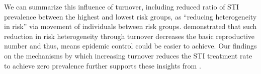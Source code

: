 We can summarize this influence of turnover,
including reduced ratio of STI prevalence between the highest and lowest risk groups,
as ``reducing heterogeneity in risk'' via movement of individuals between risk groups.
\citet{Henry2015} demonstrated that
such reduction in risk heterogeneity through turnover
decreases the basic reproductive number and thus,
means epidemic control could be easier to achieve.
Our findings on the mechanisms by which increasing turnover
reduces the STI treatment rate to achieve zero prevalence
further supports these insights from \citet{Henry2015}.
